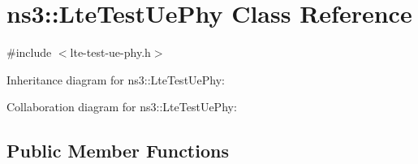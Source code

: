 \hypertarget{classns3_1_1LteTestUePhy}{}\section{ns3\+:\+:Lte\+Test\+Ue\+Phy Class Reference}
\label{classns3_1_1LteTestUePhy}


{\ttfamily \#include $<$lte-\/test-\/ue-\/phy.\+h$>$}



Inheritance diagram for ns3\+:\+:Lte\+Test\+Ue\+Phy\+:


Collaboration diagram for ns3\+:\+:Lte\+Test\+Ue\+Phy\+:
\subsection*{Public Member Functions}
